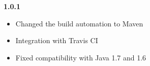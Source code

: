 \noindent
\textbf{1.0.1}
\begin{itemize}
	\renewcommand{\labelitemi}{$\bullet$}
	\item Changed the build automation to Maven
	\item Integration with Travis CI
	\item Fixed compatibility with Java 1.7 and 1.6
\end{itemize}
\newline








